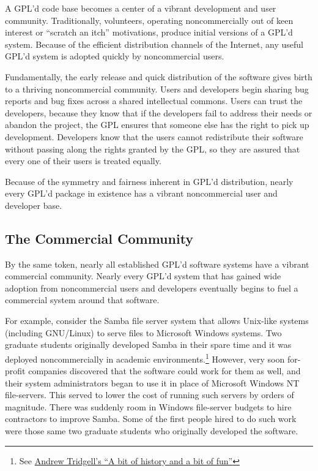 A GPL'd code base becomes a center of a vibrant development and user
community.  Traditionally, volunteers, operating noncommercially out of
keen interest or ``scratch an itch'' motivations, produce initial versions
of a GPL'd system.  Because of the efficient distribution channels of the
Internet, any useful GPL'd system is adopted quickly by noncommercial
users.

Fundamentally, the early release and quick distribution of the software
gives birth to a thriving noncommercial community.  Users and developers
begin sharing bug reports and bug fixes across a shared intellectual
commons.  Users can trust the developers, because they know that if the
developers fail to address their needs or abandon the project, the GPL
ensures that someone else has the right to pick up development.
Developers know that the users cannot redistribute their software without
passing along the rights granted by the GPL, so they are assured that every
one of their users is treated equally.

Because of the symmetry and fairness inherent in GPL'd distribution,
nearly every GPL'd package in existence has a vibrant noncommercial user
and developer base.

\subsection{The Commercial Community}

By the same token, nearly all established GPL'd software systems have a
vibrant commercial community.  Nearly every GPL'd system that has gained
wide adoption from noncommercial users and developers eventually begins
to fuel a commercial system around that software.

For example, consider the Samba file server system that allows Unix-like
systems (including GNU/Linux) to serve files to Microsoft Windows systems.
Two graduate students originally developed Samba in their spare time and
it was deployed noncommercially in academic environments.\footnote{See
  \href{http://turtle.ee.ncku.edu.tw/docs/samba/history}{Andrew Tridgell's
    ``A bit of history and a bit of fun''}}  However, very
soon for-profit companies discovered that the software could work for them
as well, and their system administrators began to use it in place of
Microsoft Windows NT file-servers.  This served to lower the cost of
running such servers by orders of magnitude. There was suddenly room in
Windows file-server budgets to hire contractors to improve Samba.  Some of
the first people hired to do such work were those same two graduate
students who originally developed the software.

